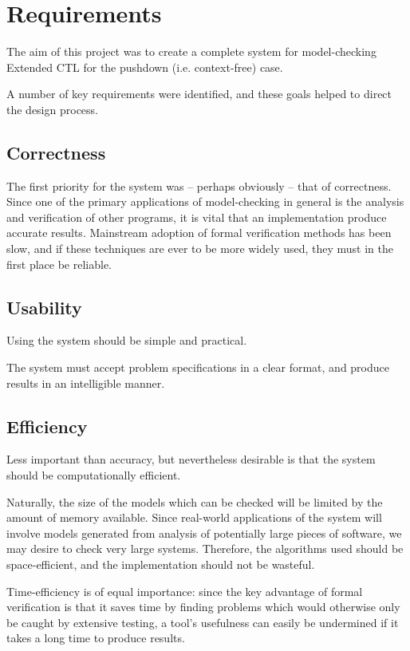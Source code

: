 \documentclass[11pt]{article}
\begin{document}
\section{Requirements}

The aim of this project was to create a complete system for model-checking
Extended CTL for the pushdown (i.e. context-free) case. 

A number of key requirements were identified, and these goals helped to direct
the design process. 


\subsection{Correctness}
The first priority for the system was -- perhaps obviously -- that of
correctness. Since one of the primary applications of model-checking in general
is the analysis and verification of other programs, it is vital that
an implementation produce accurate results. Mainstream adoption of formal
verification methods has been slow,\cite{mitra2008strategies} and if these
techniques are ever to be more widely used, they must in the first place be
reliable.


\subsection{Usability}

Using the system should be simple and practical.

The system must accept problem specifications in a clear format, 
and produce results in an intelligible manner.

\subsection{Efficiency}

Less important than accuracy, but nevertheless desirable is that the system
should be computationally efficient. 

Naturally, the size of the models which can be checked will be limited by the
amount of memory available. Since real-world applications of the system will
involve models generated from analysis of potentially large pieces of software,
we may desire to check very large systems. Therefore, the algorithms used
should be space-efficient, and the implementation should not be wasteful.

Time-efficiency is of equal importance: since the key advantage of formal
verification is that it saves time by finding problems which would otherwise
only be caught by extensive testing, a tool's usefulness can easily be
undermined if it takes a long time to produce results.
\end{document}
